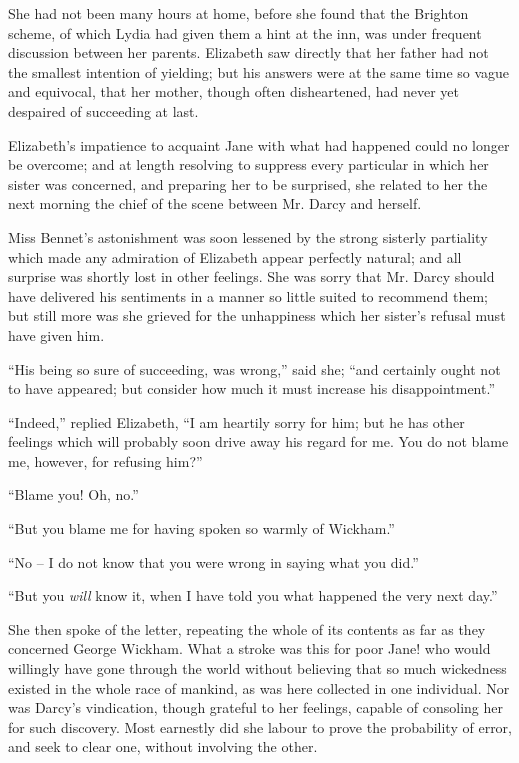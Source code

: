 She had not been many hours at home, before she found
that the Brighton scheme, of which Lydia had given them
a hint at the inn, was under frequent discussion between
her parents. Elizabeth saw directly that her father had
not the smallest intention of yielding; but his answers
were at the same time so vague and equivocal, that her
mother, though often disheartened, had never yet despaired
of succeeding at last.


Elizabeth’s impatience to acquaint Jane with what
had happened could no longer be overcome; and at length
resolving to suppress every particular in which her sister
was concerned, and preparing her to be surprised, she
related to her the next morning the chief of the scene
between Mr. Darcy and herself.

Miss Bennet’s astonishment was soon lessened by the
strong sisterly partiality which made any admiration of
Elizabeth appear perfectly natural; and all surprise was
shortly lost in other feelings. She was sorry that Mr.
Darcy should have delivered his sentiments in a manner
so little suited to recommend them; but still more was
she grieved for the unhappiness which her sister’s refusal
must have given him.

“His being so sure of succeeding, was wrong,” said she;
“and certainly ought not to have appeared; but consider
how much it must increase his disappointment.”

“Indeed,” replied Elizabeth, “I am heartily sorry for
him; but he has other feelings which will probably soon
drive away his regard for me. You do not blame me,
however, for refusing him?”

“Blame you! Oh, no.”

“But you blame me for having spoken so warmly of
Wickham.”

“No -- I do not know that you were wrong in saying
what you did.”

“But you \textit{will} know it, when I have told you what
happened the very next day.”

She then spoke of the letter, repeating the whole of its
contents as far as they concerned George Wickham.
What a stroke was this for poor Jane! who would willingly
have gone through the world without believing that so
much wickedness existed in the whole race of mankind,
as was here collected in one individual. Nor was Darcy’s
vindication, though grateful to her feelings, capable of
consoling her for such discovery. Most earnestly did she
labour to prove the probability of error, and seek to clear
one, without involving the other.

